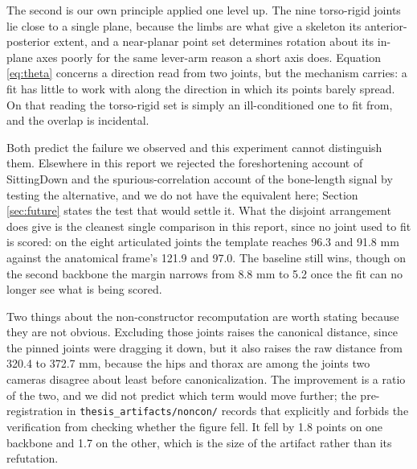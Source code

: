 The second is our own principle applied one level up. The nine torso-rigid joints lie close to a single plane, because the limbs are what give a skeleton its anterior-posterior extent, and a near-planar point set determines rotation about its in-plane axes poorly for the same lever-arm reason a short axis does. Equation \eqref{eq:theta} concerns a direction read from two joints, but the mechanism carries: a fit has little to work with along the direction in which its points barely spread. On that reading the torso-rigid set is simply an ill-conditioned one to fit from, and the overlap is incidental.

Both predict the failure we observed and this experiment cannot distinguish them. Elsewhere in this report we rejected the foreshortening account of SittingDown and the spurious-correlation account of the bone-length signal by testing the alternative, and we do not have the equivalent here; Section \ref{sec:future} states the test that would settle it. What the disjoint arrangement does give is the cleanest single comparison in this report, since no joint used to fit is scored: on the eight articulated joints the template reaches 96.3 and 91.8 mm against the anatomical frame's 121.9 and 97.0. The baseline still wins, though on the second backbone the margin narrows from 8.8 mm to 5.2 once the fit can no longer see what is being scored.

Two things about the non-constructor recomputation are worth stating because they are not obvious. Excluding those joints raises the canonical distance, since the pinned joints were dragging it down, but it also raises the raw distance from 320.4 to 372.7 mm, because the hips and thorax are among the joints two cameras disagree about least before canonicalization. The improvement is a ratio of the two, and we did not predict which term would move further; the pre-registration in \texttt{thesis\_artifacts/noncon/} records that explicitly and forbids the verification from checking whether the figure fell. It fell by 1.8 points on one backbone and 1.7 on the other, which is the size of the artifact rather than its refutation.

